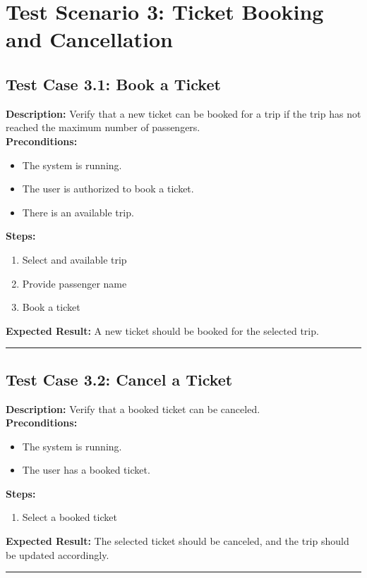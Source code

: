 \documentclass{article}
\begin{document}
\pagebreak

\section{Test Scenario 3: Ticket Booking and Cancellation}
\bigskip
\bigskip
\subsection{Test Case 3.1: Book a Ticket}

\textbf{Description:} Verify that a new ticket can be booked for a trip if the trip has not reached the maximum number of passengers.\\
\textbf{Preconditions:}
\begin{itemize}
  \item The system is running.
  \item The user is authorized to book a ticket.
  \item There is an available trip.
\end{itemize}
\textbf{Steps:}
\begin{enumerate}
  \item Select and available trip
  \item Provide passenger name
  \item Book a ticket
\end{enumerate}
\textbf{Expected Result:}  A new ticket should be booked for the selected trip.

\bigskip
\hrule
\bigskip

\subsection{Test Case 3.2: Cancel a Ticket}

\textbf{Description:} Verify that a booked ticket can be canceled.\\
\textbf{Preconditions:}
\begin{itemize}
  \item The system is running.
  \item The user has a booked ticket.
\end{itemize}
\textbf{Steps:}
\begin{enumerate}
  \item Select a booked ticket
\end{enumerate}
\textbf{Expected Result:} The selected ticket should be canceled, and the trip should be updated accordingly.

\bigskip
\hrule
\bigskip
\end{document}
